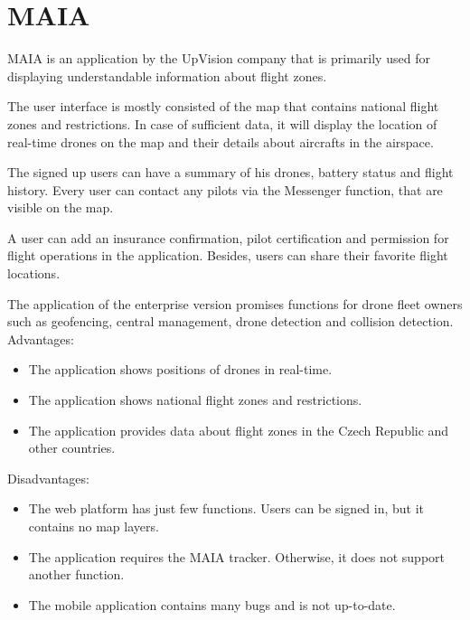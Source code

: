\section{MAIA}\label{sec:maia}
MAIA is an application by the UpVision company that is primarily used for displaying understandable information about flight zones.~\cite{maia}

The user interface is mostly consisted of the map that contains national flight zones and restrictions.
In case of sufficient data, it will display the location of real-time drones on the map and their details about aircrafts in the airspace.

The signed up users can have a summary of his drones, battery status and flight history.
Every user can contact any pilots via the Messenger function, that are visible on the map.

A user can add an insurance confirmation, pilot certification and permission for flight operations in the application.
Besides, users can share their favorite flight locations.

The application of the enterprise version promises functions for drone fleet owners such as geofencing, central management, drone detection and collision detection.
\newline
\newline
Advantages:
\begin{itemize}
    \item The application shows positions of drones in real-time.
    \item The application shows national flight zones and restrictions.
    \item The application provides data about flight zones in the Czech Republic and other countries.
\end{itemize}
Disadvantages:
\begin{itemize}
    \item The web platform has just few functions.
    Users can be signed in, but it contains no map layers.
    \item The application requires the MAIA tracker.
    Otherwise, it does not support another function.~\cite{maia}
    \item The mobile application contains many bugs and is not up-to-date.
\end{itemize}